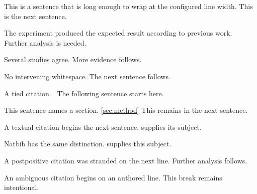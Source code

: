 This is a sentence that is long enough to wrap at the configured line width. \cite{Smith} This is the next sentence.

The experiment produced the expected result according to previous work. \parencite[see][p.~5]{Jones} Further analysis is needed.

Several studies agree. \citep{Alpha} \parencite{Beta} \autocite{Gamma} More evidence follows.

No intervening whitespace.\cite{Gamma} The next sentence follows.

A tied citation.~\cite{Tied} The following sentence starts here.

This sentence names a section. \ref{sec:method} This remains in the next sentence.

A textual citation begins the next sentence. \textcite{Delta} supplies its subject.

Natbib has the same distinction. \citet{Epsilon} supplies this subject.

A postpositive citation was stranded on the next line.
\parencite{Zeta} Further analysis follows.

An ambiguous citation begins on an authored line.
\cite{Eta} This break remains intentional.
